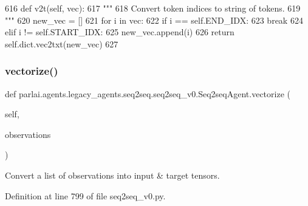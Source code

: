 \begin{DoxyCode}
616     \textcolor{keyword}{def }v2t(self, vec):
617         \textcolor{stringliteral}{"""}
618 \textcolor{stringliteral}{        Convert token indices to string of tokens.}
619 \textcolor{stringliteral}{        """}
620         new\_vec = []
621         \textcolor{keywordflow}{for} i \textcolor{keywordflow}{in} vec:
622             \textcolor{keywordflow}{if} i == self.END\_IDX:
623                 \textcolor{keywordflow}{break}
624             \textcolor{keywordflow}{elif} i != self.START\_IDX:
625                 new\_vec.append(i)
626         \textcolor{keywordflow}{return} self.dict.vec2txt(new\_vec)
627 
\end{DoxyCode}
\mbox{\label{classparlai_1_1agents_1_1legacy__agents_1_1seq2seq_1_1seq2seq__v0_1_1Seq2seqAgent_a83e2433e00bff6162ebad3b818771b59}} 
\subsubsection{\texorpdfstring{vectorize()}{vectorize()}}
{\footnotesize\ttfamily def parlai.\+agents.\+legacy\+\_\+agents.\+seq2seq.\+seq2seq\+\_\+v0.\+Seq2seq\+Agent.\+vectorize (\begin{DoxyParamCaption}\item[{}]{self,  }\item[{}]{observations }\end{DoxyParamCaption})}

\begin{DoxyVerb}Convert a list of observations into input & target tensors.
\end{DoxyVerb}
 

Definition at line 799 of file seq2seq\+\_\+v0.\+py.


